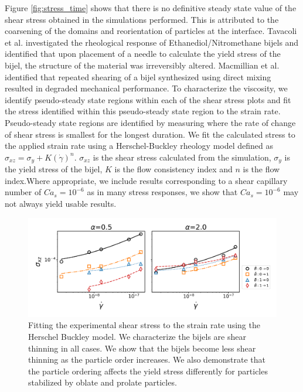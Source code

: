 Figure \ref{fig:stress_time} shows that there is no definitive steady state value of the shear stress obtained in the simulations performed. This is
attributed to the coarsening of the domains and reorientation of particles at the interface. \cite{tavacoli_novel_2011,macmillan_rheological_2019} 
Tavacoli et al. investigated the rheological response of Ethanediol/Nitromethane bijels and identified that upon placement of a needle to calculate the yield
stress of the bijel, the structure of the material was irreversibly altered. \cite{tavacoli_novel_2011} Macmillian et al. identified that repeated 
shearing of a bijel synthesized using direct mixing resulted in degraded mechanical performance. \cite{macmillan_rheological_2019}
To characterize the viscosity, we identify pseudo-steady state regions within each of the shear stress plots and fit the stress identified within this 
pseudo-steady state region to the strain rate. Pseudo-steady state regions are identified by measuring where the rate of change of shear stress is 
smallest for the longest duration. We fit the calculated stress to the applied strain rate using a Herschel-Buckley rheology model defined as
$\sigma_{xz} = \sigma_{y} + K(\dot{\gamma})^{n}$. $\sigma_{xz}$ is the shear stress calculated from the simulation, $\sigma_{y}$ is the yield stress of the bijel, 
$K$ is the flow consistency index and $n$ is the flow index.Where appropriate, we include results corresponding to a shear capillary number of 
$Ca_s = 10^{-6}$ as in many stress responses, we show that $Ca_s = 10^{-6}$ may not always yield usable results.

\begin{figure} 
    \centering 
    \includegraphics[scale=0.4]{../figures/results/paper3/stress_strain-all.png} 
    \caption{Fitting the experimental shear stress to the strain rate using the Herschel Buckley model. We characterize the bijels are 
             shear thinning in all cases. We show that the bijels become less shear thinning as the particle order increases. We also
             demonstrate that the particle ordering affects the yield stress differently for particles stabilized by oblate and 
             prolate particles.} 
    \label{fig:stress_strain} 
\end{figure}

